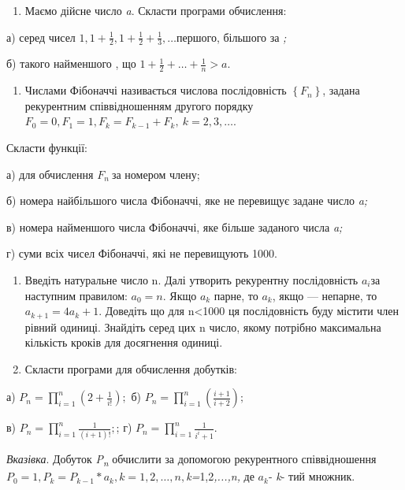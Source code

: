 \documentclass[]{article}
\begin{document}
\begin{enumerate}
\def\labelenumi{\arabic{enumi})}
\item
  Маємо дійсне число \emph{a}. Скласти програми обчислення:
\end{enumerate}

а) серед чисел
\(1,1 + \frac{1}{2},1 + \frac{1}{2} + \frac{1}{3},\ldots\)першого,
більшого за \emph{;}

б) такого найменшого , що
\(1 + \frac{1}{2} + \ldots + \frac{1}{n} > a.\)

\begin{enumerate}
\def\labelenumi{\arabic{enumi})}
\item
  Числами Фібоначчі називається числова послідовність
  \(\left\{ F_{n} \right\}\), задана рекурентним співвідношенням другого
  порядку
  \(F_{0} = 0,F_{1} = 1,F_{k} = F_{k - 1} + F_{k},\ k = 2,3,\ldots\).
\end{enumerate}

Скласти функції:

а) для обчислення \(F_{n}\ \)за номером члену;

б) номера найбільшого числа Фібоначчі, яке не перевищує задане число
\emph{a;}

в) номера найменшого числа Фібоначчі, яке більше заданого числа
\emph{a;}

г) суми всіх чисел Фібоначчі, які не перевищують 1000.

\begin{enumerate}
\def\labelenumi{\arabic{enumi})}
\item
  Введіть натуральне число n. Далі утворить рекурентну послідовність
  \(a_{i}\)за наступним правилом: \(a_{0} = n\). Якщо \(a_{k}\) парне,
  то \(a_{k}\), якщо --- непарне, то\(a_{k + 1} = 4a_{k} + 1\). Доведіть
  що для n\textless{}1000 ця послідовність буду містити член рівний
  одиниці. Знайдіть серед цих n число, якому потрібно максимальна
  кількість кроків для досягнення одиниці.
\item
  Скласти програми для обчислення добутків:
\end{enumerate}

а) \(P_{n} = \prod_{i = 1}^{n}\left( 2 + \frac{1}{i!} \right);\) б)
\(P_{n} = \prod_{i = 1}^{n}\left( \frac{i + 1}{i + 2} \right);\)

в) \(P_{n} = \prod_{i = 1}^{n}\frac{1}{(i + 1)!};\); г)
\(P_{n} = \prod_{i = 1}^{n}\frac{1}{i^{i} + 1}.\)

\emph{\emph{Вказівка}}. Добуток \emph{P\textsubscript{n}} обчислити за
допомогою рекурентного співвідношення
\(P_{0} = 1,P_{k} = P_{k - 1}*a_{k},k = 1,2,\ldots,n,\)\emph{k=}1,2\emph{,...,n,}
де \(a_{k}\)- \emph{k}- тий множник.
\end{document}
